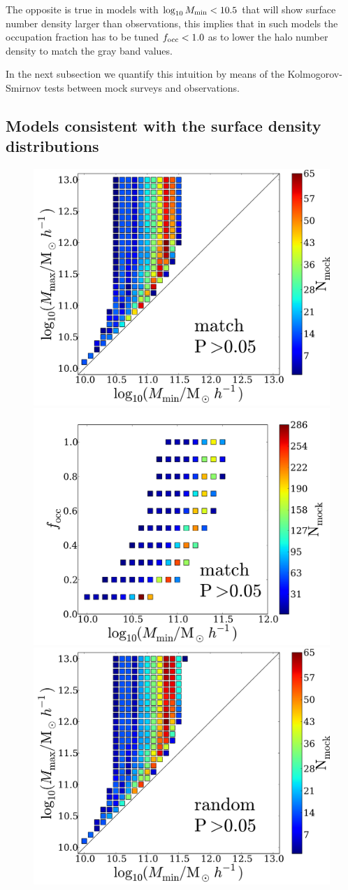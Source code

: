 \documentclass[usenatbib]{mn2e}
\begin{document}
The opposite is true in models with $\log_{10} M_{\rm min}<10.5$
that will show surface number density larger than observations, this
implies that in such models the occupation fraction has to be tuned
$f_{\rm occ}<1.0$ as to lower the halo number density to match the
gray band values.

In the next subsection we quantify this intuition by means of the
Kolmogorov-Smirnov tests between mock surveys and observations. 

\subsection{Models consistent with the surface density distributions}

\begin{figure}
\begin{center}
\includegraphics[width=0.46\linewidth,angle=0]{./plots/Fig2_match_P5.pdf}
\vspace{5mm}
\includegraphics[width=0.49\linewidth,angle=0]{./plots/Fig3_match_P5.pdf}\\
\includegraphics[width=0.46\linewidth,angle=0]{./plots/Fig2_random_P5.pdf}

\end{center}
\end{figure}
\end{document}
